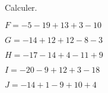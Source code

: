 \begin{exercice*}
    Calculer.
        \begin{list}{}
            \item $ F = -5-19+13+3-10 $
            \item $ G = -14+12+12-8-3 $
            \item $ H = -17-14+4-11+9 $
            \item $ I = -20-9+12+3-18 $
            \item $ J = -14+1-9+10+4 $
        \end{list}

\end{exercice*}
